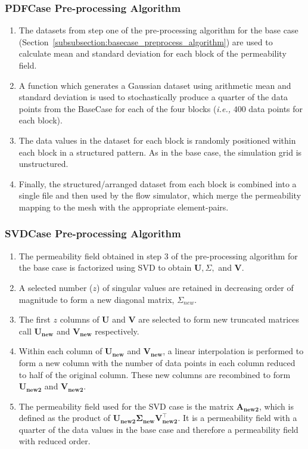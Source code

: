\documentclass[preprint,12pt]{elsarticle}
\newcommand{\ie}{{\it i.e., }}
\begin{document}
\subsubsection{PDFCase Pre-processing Algorithm}\label{subsubsection:pdfcase_preprocess_algorithm}
\begin{enumerate}[1.]
  \item The datasets from step one of the pre-processing algorithm for the base case (Section~\ref{subsubsection:basecase_preprocess_algorithm}) are used to calculate mean and standard deviation for each block of the permeability field.
  \item A function which generates a Gaussian dataset using arithmetic mean and standard deviation is used to stochastically produce a quarter of the data points from the BaseCase for each of the four blocks  (\ie $400$ data points for each block).
  \item The data values in the dataset for each block is randomly positioned within each block in a structured pattern. As in the base case, the simulation grid is unstructured.
  \item Finally, the structured/arranged dataset from each block is combined into a single file and then used by the flow simulator, which merge the permeability mapping to the mesh with the appropriate element-pairs.
\end{enumerate}


\subsubsection{SVDCase Pre-processing Algorithm}\label{subsubsection:svdcase_preprocess_algorithm}
\begin{enumerate}[1.]
  \item The permeability field obtained in step 3 of the pre-processing algorithm for the base case is factorized using SVD to obtain $\mathbf{U}, \Sigma,$ and $\mathbf{V}$.
  \item A selected number ($z$) of singular values are retained in decreasing order of magnitude to form a new diagonal matrix, $\Sigma_{new}$.
  \item The first $z$ columns of $\mathbf{U}$ and $\mathbf{V}$ are selected to form new truncated matrices call $\mathbf{U_{new}}$ and $\mathbf{V_{new}}$ respectively.
  \item Within each column of $\mathbf{U_{new}}$ and $\mathbf{V_{new}}$, a linear interpolation is performed to form a new column with the number of data points in each column reduced to half of the original column. These new columns are recombined to form $\mathbf{U_{new2}}$ and $\mathbf{V_{new2}}$.
  \item The permeability field used for the SVD case is the matrix $\mathbf{A_{new2}}$, which is defined as the product of $\mathbf{U_{new2}} \mathbf{\Sigma_{new}} \mathbf{V_{new2}^{\intercal}}$. It is a permeability field with a quarter of the data values in the base case and therefore a permeability field with reduced order.  
\end{enumerate}
\end{document}

